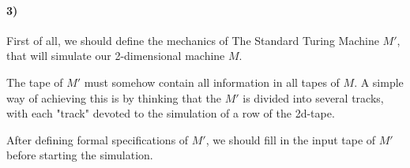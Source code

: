 \documentclass[12pt]{article}
\begin{document}
\paragraph{3)} First of all, we should define the mechanics of The Standard Turing Machine $M'$, that will simulate our 2-dimensional machine $M$.

The tape of $M'$ must somehow contain all information in all tapes of $M$. A simple way of achieving this is by thinking that the $M'$ is divided into several tracks, with each "track" devoted to the simulation of a row of the 2d-tape.

After defining formal specifications of $M'$, we should fill in the input tape of $M'$ before starting the simulation.
\end{document}
